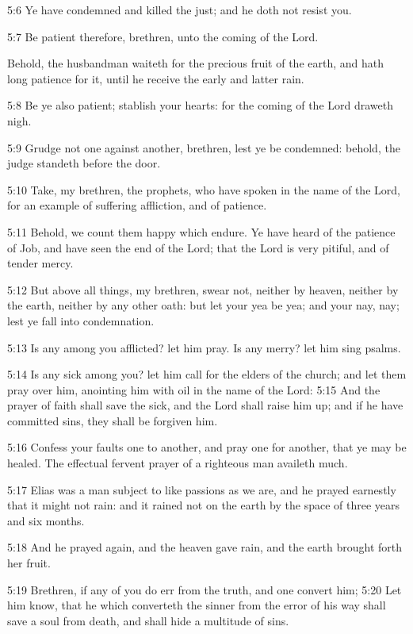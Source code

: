 5:6 Ye have condemned and killed the just; and he doth not resist you.

5:7 Be patient therefore, brethren, unto the coming of the Lord.

Behold, the husbandman waiteth for the precious fruit of the earth, and hath long patience for it, until he receive the early and latter rain.

5:8 Be ye also patient; stablish your hearts: for the coming of the Lord draweth nigh.

5:9 Grudge not one against another, brethren, lest ye be condemned: behold, the judge standeth before the door.

5:10 Take, my brethren, the prophets, who have spoken in the name of the Lord, for an example of suffering affliction, and of patience.

5:11 Behold, we count them happy which endure. Ye have heard of the patience of Job, and have seen the end of the Lord; that the Lord is very pitiful, and of tender mercy.

5:12 But above all things, my brethren, swear not, neither by heaven, neither by the earth, neither by any other oath: but let your yea be yea; and your nay, nay; lest ye fall into condemnation.

5:13 Is any among you afflicted? let him pray. Is any merry? let him sing psalms.

5:14 Is any sick among you? let him call for the elders of the church; and let them pray over him, anointing him with oil in the name of the Lord: 5:15 And the prayer of faith shall save the sick, and the Lord shall raise him up; and if he have committed sins, they shall be forgiven him.

5:16 Confess your faults one to another, and pray one for another, that ye may be healed. The effectual fervent prayer of a righteous man availeth much.

5:17 Elias was a man subject to like passions as we are, and he prayed earnestly that it might not rain: and it rained not on the earth by the space of three years and six months.

5:18 And he prayed again, and the heaven gave rain, and the earth brought forth her fruit.

5:19 Brethren, if any of you do err from the truth, and one convert him; 5:20 Let him know, that he which converteth the sinner from the error of his way shall save a soul from death, and shall hide a multitude of sins.

